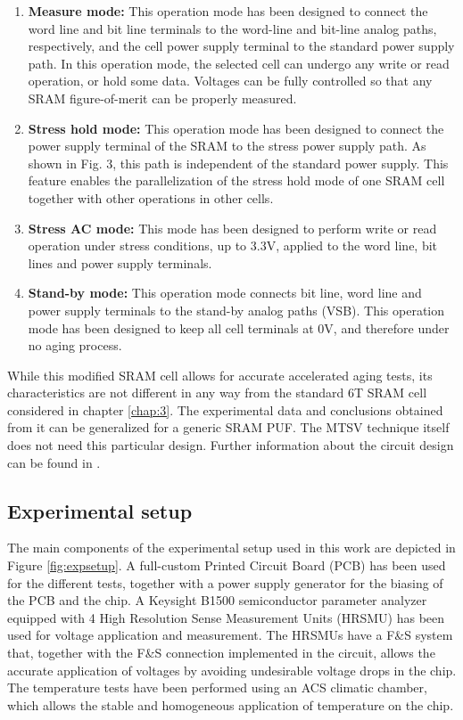 \begin{enumerate}
    \item \textbf{Measure mode:} This operation mode has been designed to connect the word line and bit line terminals to the word-line and bit-line analog paths, respectively, and the cell power supply terminal to the standard power supply path. In this operation mode, the selected cell can undergo any write or read operation, or hold some data. Voltages can be fully controlled so that any SRAM figure-of-merit can be properly measured.
    \item \textbf{Stress hold mode:} This operation mode has been designed to connect the power supply terminal of the SRAM to the stress power supply path. As shown in Fig. 3, this path is independent of the standard power supply. This feature enables the parallelization of the stress hold mode of one SRAM cell together with other operations in other cells.
    \item \textbf{Stress AC mode:} This mode has been designed to perform write or read operation under stress conditions, up to 3.3V, applied to the word line, bit lines and power supply terminals.
    \item \textbf{Stand-by mode:} This operation mode connects bit line, word line and power supply terminals to the stand-by analog paths (VSB). This operation mode has been designed to keep all cell terminals at 0V, and therefore under no aging process.
\end{enumerate}



While this modified SRAM cell allows for accurate accelerated aging tests, its characteristics are not different in any way from the standard 6T SRAM cell considered in chapter \ref{chap:3}. The experimental data and conclusions obtained from it can be generalized for a generic SRAM PUF. The MTSV technique itself does not need this particular design. Further information about the circuit design can be found in \cite{Saraza-Canflanca2018}.

\subsection{Experimental setup}
\label{sec:exp_setup}
The main components of the experimental setup used in this work are depicted in Figure \ref{fig:expsetup}. A full-custom Printed Circuit Board (PCB) has been used for the different tests, together with a power supply generator for the biasing of the PCB and the chip. A Keysight B1500 semiconductor parameter analyzer equipped with 4 High Resolution Sense Measurement Units (HRSMU) has been used for voltage application and measurement. The HRSMUs have a F\&S system that, together with the F\&S connection implemented in the circuit, allows the accurate application of voltages by avoiding undesirable voltage drops in the chip. The temperature tests have been performed using an ACS climatic chamber, which allows the stable and homogeneous application of temperature on the chip.

